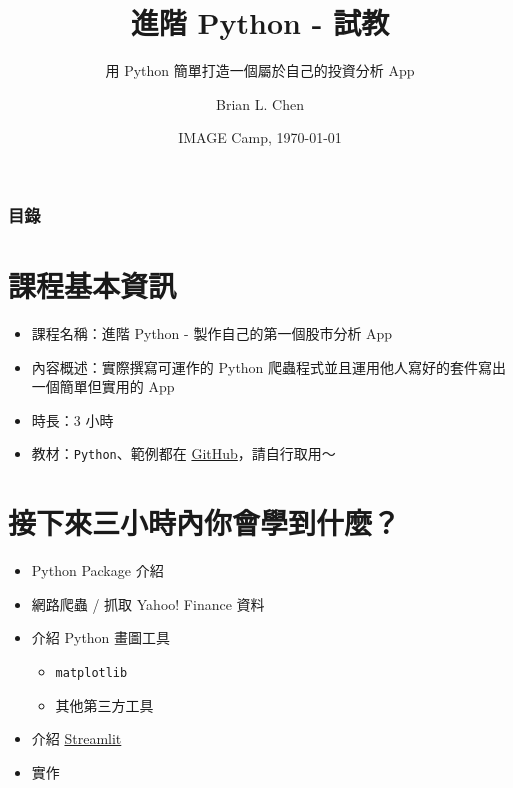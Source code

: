 \documentclass{beamer}
\title{進階 Python - 試教}
\subtitle{用 Python 簡單打造一個屬於自己的投資分析 App}
\author{Brian L. Chen}
\institute{
  Department of Information Management\\
  National Taiwan University
}
\date{IMAGE Camp, \today}
\newcommand{\code}[1]{\texttt{\textcolor{pinky}{#1}}}
\begin{document}
\frame{\titlepage}


\begin{frame}
  \frametitle{目錄}
  \tableofcontents
\end{frame}

\section{課程基本資訊}

\begin{frame}
  \begin{itemize}
    \item 課程名稱：進階 Python - 製作自己的第一個股市分析 App
    \item 內容概述：實際撰寫可運作的 Python 爬蟲程式並且運用他人寫好的套件寫出一個簡單但實用的 App
    \item 時長：3 小時
    \item 教材：\code{Python}、範例都在 \href{https://github.com/icheft/IMAGE2021-Stock-Analysis-Tutorial}{GitHub}，請自行取用～
  \end{itemize}

\end{frame}


\section{接下來三小時內你會學到什麼？}
\begin{frame}
  \begin{itemize}
    \item Python Package 介紹
    \item 網路爬蟲 / 抓取 Yahoo! Finance 資料
    \item 介紹 Python 畫圖工具
          \begin{itemize}
            \item \code{matplotlib}
            \item 其他第三方工具
          \end{itemize}
    \item 介紹 \href{https://streamlit.io}{Streamlit}
    \item 實作
  \end{itemize}
\end{frame}
\end{document}
